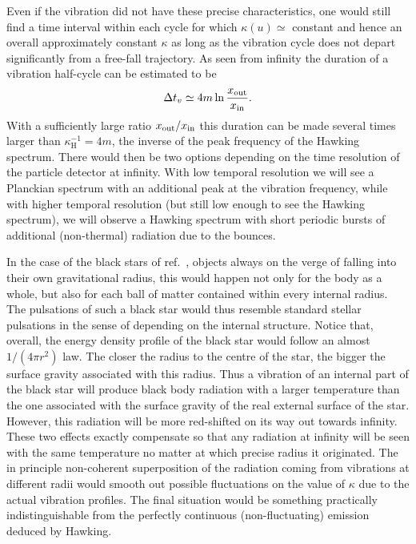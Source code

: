 \documentclass[11pt,a4paper]{article}
\begin{document}
Even if the vibration did not have these precise characteristics,
one would still find a time interval  within each cycle for which
$\kappa(u) \simeq $ constant and hence an overall approximately constant $\kappa$ as long as the vibration cycle does not depart significantly from a free-fall trajectory. As seen from infinity the duration of a
vibration half-cycle can be estimated to be
%
\begin{eqnarray}
\Delta t_v\simeq 4 m \ln {x_{\rm out} \over x_{\rm in}}.
\end{eqnarray}
%
 With a sufficiently large ratio $x_{\rm out}/x_{\rm in}$ this duration can be
made several times larger than $\kappa_\text{H}^{-1} = 4m$, the inverse of the peak
frequency of the Hawking spectrum. There would then be two options depending on the time resolution of the particle detector at infinity. With low temporal resolution we will see a Planckian spectrum with an additional peak at the vibration frequency, while with higher  temporal resolution (but still low enough to see the Hawking spectrum), we will observe a Hawking spectrum with  short periodic bursts of additional (non-thermal) radiation due to the bounces.

In the case of the black stars of ref.~\cite{barcelo-fate}, objects always on the verge of falling into their
own gravitational radius,  this would happen not only for the body as a whole,
but also for each ball of matter contained within every internal radius. The pulsations of such a black star would thus resemble standard stellar pulsations in the sense of depending on the internal structure. Notice
that, overall, the energy density profile of the black star would follow an almost
$1/(4\pi r^2)$ law. 
The closer the radius to the centre of the star, the bigger the surface
gravity associated with this radius. Thus a vibration of an internal part of the
black star will produce black body radiation with a larger temperature
than the one associated with the surface gravity of the real external surface of
the star. However, this radiation will be more red-shifted on its way out
towards infinity. These two effects exactly compensate so that any
radiation at infinity will be seen with the same temperature no matter at which
precise radius  it originated. The in principle non-coherent superposition of the radiation coming from  vibrations at different  radii would smooth out possible  fluctuations on the value of $\kappa$ due to the actual vibration profiles.  The final situation would be  something practically indistinguishable from the perfectly continuous (non-fluctuating) emission deduced by Hawking.  
\end{document}
